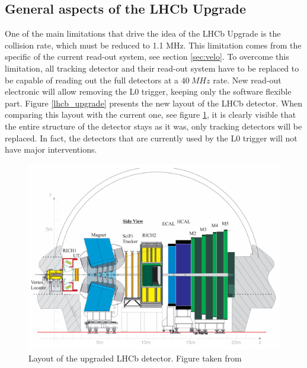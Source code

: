 \subsection{General aspects of the LHCb Upgrade}

One of the main limitations that drive the idea of the LHCb Upgrade is the collision rate, which must be reduced to 1.1 MHz. This limitation comes from the specific of the current read-out system, see section \ref{sec:velo}.  To overcome this limitation, all tracking detector and their read-out system have to be replaced to be capable of reading out the full detectors at a $40 ~MHz$ rate. New read-out electronic will allow removing the L0 trigger, keeping only the software flexible part. Figure \ref{lhcb_upgrade} presents the new layout of the LHCb detector. When comparing this layout with the current one, see figure \ref{fig:LHCBlayout}, it is clearly visible that the entire structure of the detector stays as it was, only tracking detectors will be replaced. In fact, the detectors that are currently used by the L0 trigger will not have major interventions. 

\begin{figure}[!h]
\centering
\includegraphics[width=\linewidth]{figures/LHCb_upgrade.PNG}
\caption{Layout of the upgraded LHCb detector. Figure taken from \cite{upgrade_tdr}
\label{fig:LHCBlayout}}
\end{figure}

